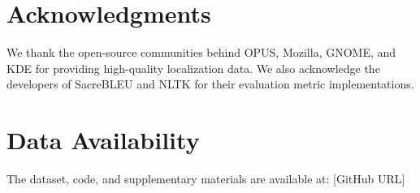 \section*{Acknowledgments}

We thank the open-source communities behind OPUS, Mozilla, GNOME, and KDE for providing high-quality localization data. We also acknowledge the developers of SacreBLEU and NLTK for their evaluation metric implementations.

\section*{Data Availability}

The dataset, code, and supplementary materials are available at: [GitHub URL]

